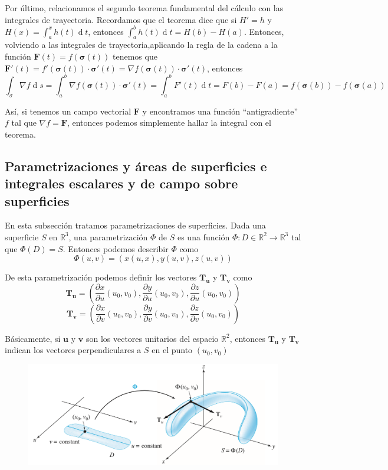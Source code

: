 \documentclass[a4paper]{article}
\renewcommand{\d}[1]{\ensuremath{\operatorname{d}\!{#1}}}
\begin{document}
Por último, relacionamos el segundo teorema fundamental del cálculo con las integrales de trayectoria. Recordamos que el teorema dice que si $H' = h$ y $H(x) = \int_a^x h(t) \d{t}$, entonces $\int_a^b h(t) \d{t} = H(b) - H(a)$. Entonces, volviendo a las integrales de trayectoria,aplicando la regla de la cadena a la función $\textbf{F}(t) =  f(\boldsymbol{\sigma}(t))$ tenemos que $\textbf{F}'(t) = f'(\boldsymbol{\sigma}(t))\cdot\boldsymbol{\sigma}'(t) = \nabla f(\boldsymbol{\sigma}(t))\cdot\boldsymbol{\sigma}'(t)$,  entonces
\[  \int_\sigma \nabla f \d{s} = \int_a^b \nabla f(\boldsymbol{\sigma}(t))\cdot \boldsymbol{\sigma}'(t) = \int_a^b F'(t) \d{t} = F(b)-F(a) = f(\boldsymbol{\sigma}(b)) - f(\boldsymbol{\sigma}(a)) \]

Así, si tenemos un campo vectorial $\textbf{F}$ y encontramos una función ``antigradiente'' $f$ tal que $\nabla f = \textbf{F}$, entonces podemos simplemente hallar la integral con el teorema.

\subsection{Parametrizaciones y áreas de superficies e integrales escalares y de campo sobre superficies}
En esta subsección tratamos parametrizaciones de superficies. Dada una superficie $S$ en $\mathbb{R}^3$, una parametrización $\Phi$ de $S$ es una función $\Phi:D \in \mathbb{R}^2 \rightarrow \mathbb{R}^3$ tal que $\Phi(D) = S$. Entonces podemos describir $\Phi$ como
\[\Phi(u,v) = (x(u,x), y(u,v), z(u,v)) \]

De esta parametrización podemos definir los vectores $\textbf{T}_\textbf{u}$ y $\textbf{T}_\textbf{v}$ como
\[\textbf{T}_\textbf{u} = \left(\frac{\partial x}{\partial u }(u_0,v_0) , \frac{\partial y}{\partial u }(u_0,v_0) , \frac{\partial z}{\partial u }(u_0,v_0)\right)\]
\[\textbf{T}_\textbf{v} = \left(\frac{\partial x}{\partial v }(u_0,v_0) , \frac{\partial y}{\partial v }(u_0,v_0) , \frac{\partial z}{\partial v }(u_0,v_0)\right) \]

Básicamente, si $\textbf{u}$ y $\textbf{v}$ son los vectores unitarios del espacio $\mathbb{R}^2$, entonces $\textbf{T}_\textbf{u}$ y $\textbf{T}_\textbf{v}$ indican los vectores perpendiculares a $S$ en el punto $(u_0, v_0)$

\begin{figure}[H]
	\centering
	\includegraphics[width = 0.7\linewidth]{imagenes/phi.jpg}
\end{figure}
\end{document}
